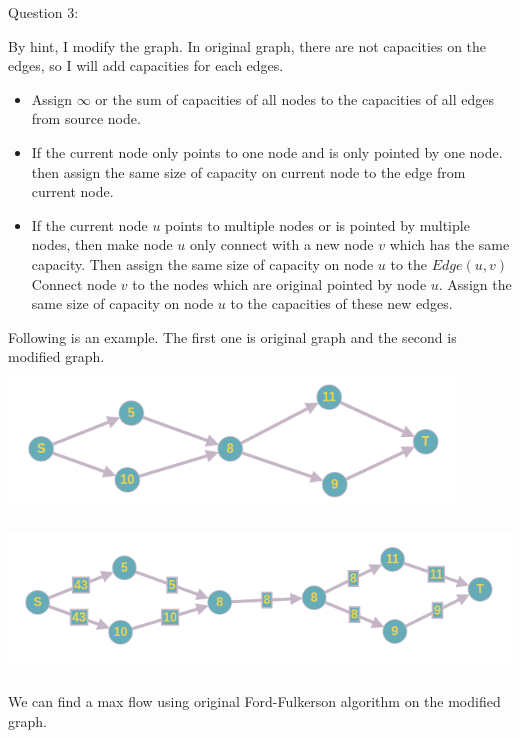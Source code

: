 \documentclass[12pt]{article}
\begin{document}
\pagebreak
\noindent
\large Question 3: \vspace{5mm} \par
\normalsize 
By hint, I modify the graph. 
In original graph, there are not capacities on the edges, so I will add capacities for each edges.

\begin{itemize}
  \item Assign $\infty$ or the sum of capacities of all nodes to the capacities of all edges from source node. 
  \item If the current node only points to one node and is only pointed by one node.
	then assign the same size of capacity on current node to the edge from current node. 
  \item If the current node $u$ points to multiple nodes or is pointed by multiple nodes, 
	then make node $u$ only connect with a new node $v$ which has the same capacity.
	Then assign the same size of capacity on node $u$ to the $Edge(u, v)$ 
	Connect node $v$ to the nodes which are original pointed by node $u$. 
	Assign the same size of capacity on node $u$ to the capacities of these new edges.  	

\end{itemize}
\par
Following is an example. The first one is original graph and the second is modified graph. \\
\includegraphics[width=12cm, height=4cm]{question3L} \\
\includegraphics[width=15cm, height=4cm]{question3R} 

\par
We can find a max flow using original Ford-Fulkerson algorithm on the modified graph.
\\
\end{document}
